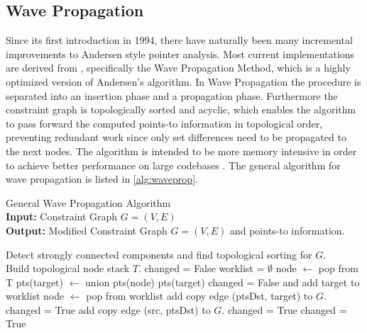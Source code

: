 \subsection{Wave Propagation}
Since its first introduction in 1994, there have naturally been many incremental improvements to Andersen style pointer analysis.
Most current implementations are derived from \cite{waveprop}, specifically the Wave Propagation Method, which is a highly optimized version of Andersen's algorithm.
In Wave Propagation the procedure is separated into an insertion phase and a propagation phase. Furthermore the constraint graph is topologically sorted and acyclic, which enables the algorithm to pass forward the computed points-to information in topological order, preventing redundant work since only set differences need to be propagated to the next nodes. The algorithm is intended to be more memory intensive in order to achieve better performance on large codebases \cite{waveprop}.
The general algorithm for wave propagation is listed in \autoref{alg:waveprop}.

\begin{algorithm}
    \caption[General Wave Propagation Algorithm]{General Wave Propagation Algorithm \\ \textbf{Input:} Constraint Graph $G=(V,E)$ \\ \textbf{Output:} Modified Constraint Graph $G=(V,E)$ and points-to information.}\label{alg:waveprop}
    \begin{algorithmic}
        \State Detect strongly connected components and find topological sorting for $G$. \\ Build topological node stack $T$.
        \Repeat
        \State changed = False
        \State worklist = $\emptyset$
        \State node $\leftarrow$ pop from T
        \State pts(target) $\leftarrow$ union pts(node) pts(target)
        \State changed = False and add target to worklist
        \EndIf
        \EndFor
        \EndWhile
        \State node $\leftarrow$ pop from worklist
        \State add copy edge (ptsDst, target) to $G$.
        \State changed = True
        \EndIf
        \EndFor
        \EndFor
        \State add copy edge (src, ptsDst) to $G$.
        \State changed = True
        \EndIf
        \EndFor
        \EndFor
        \EndWhile
        \State changed = True
        \EndIf
    \end{algorithmic}
\end{algorithm}

